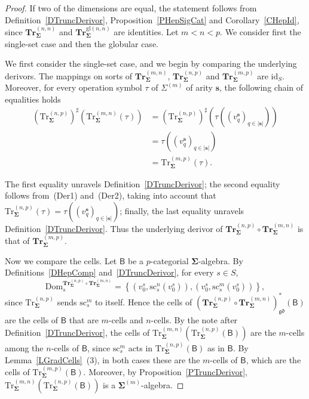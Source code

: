 \documentclass[a4paper, reqno
]{amsart}
\newcommand{\bb}[1]{\ensuremath{\lvert #1 \rvert}}
\newcommand{\sig}[1]{\mathbf{#1}}             %
\newcommand{\calg}[1]{\boldsymbol{\mathsf{#1}}} %
\newcommand{\Dom}{\mathrm{Dom}}
\newcommand{\id}{\mathrm{id}}
\newcommand{\gd}{\mathfrak{gd}}              %
\newcommand{\gl}{\mathrm{gl}}                %
\newcommand{\src}{\mathrm{sc}}
\newcommand{\Tr}{\mathrm{Tr}}
\newcommand{\bTr}{\mathbf{Tr}}
\theoremstyle{plain}
\theoremstyle{definition}
\begin{document}
\begin{proof}
If two of the dimensions are equal, the statement follows from Definition~\ref{DTruncDerivor}, Proposition~\ref{PHepSigCat} and Corollary~\ref{CHepId}, since $\bTr^{(n,n)}_{\sig{\Sigma}}$ and $\bTr^{\gl(n,n)}_{\sig{\Sigma}}$ are identities.
Let $m<n<p$.
We consider first the single-set case and then the globular case.

We first consider the single-set case, and we begin by comparing the underlying derivors.
The mappings on sorts of $\bTr^{(m,n)}_{\sig{\Sigma}}$, $\bTr^{(n,p)}_{\sig{\Sigma}}$ and $\bTr^{(m,p)}_{\sig{\Sigma}}$ are $\id_{S}$.
Moreover, for every operation symbol $\tau$ of $\Sigma^{(m)}$ of arity $\mathbf{s}$, the following chain of equalities holds
\begin{align*}
\left(\Tr^{(n,p)}_{\sig{\Sigma}}\right)^{\sharp}\left(\Tr^{(m,n)}_{\sig{\Sigma}}(\tau)\right)
&=
\left(\Tr^{(n,p)}_{\sig{\Sigma}}\right)^{\sharp}\left(\tau\left((v^{\mathbf{s}}_{q})_{q\in\bb{\mathbf{s}}}\right)\right)
\tag{1}
\\&=
\tau\left((v^{\mathbf{s}}_{q})_{q\in\bb{\mathbf{s}}}\right)
\tag{2}
\\&=
\Tr^{(m,p)}_{\sig{\Sigma}}(\tau).
\tag{3}
\end{align*}

The first equality unravels Definition~\ref{DTruncDerivor}; the second equality follows from~(Der1) and~(Der2), taking into account that $\Tr^{(n,p)}_{\sig{\Sigma}}(\tau)=\tau((v^{\mathbf{s}}_{q})_{q\in\bb{\mathbf{s}}})$; finally, the last equality unravels Definition~\ref{DTruncDerivor}.
Thus the underlying derivor of $\bTr^{(n,p)}_{\sig{\Sigma}}\circ\bTr^{(m,n)}_{\sig{\Sigma}}$ is that of $\bTr^{(m,p)}_{\sig{\Sigma}}$.

Now we compare the cells.
Let $\calg{B}$ be a $p$-categorial $\sig{\Sigma}$-algebra.
By Definitions~\ref{DHepComp} and~\ref{DTruncDerivor}, for every $s\in S$,
$$
\Dom^{\bTr^{(n,p)}_{\sig{\Sigma}}\circ\bTr^{(m,n)}_{\sig{\Sigma}}}_{s}=\left\lbrace\left(v^{s}_{0},\src^{n}_{s}(v^{s}_{0})\right),\left(v^{s}_{0},\src^{m}_{s}(v^{s}_{0})\right)\right\rbrace,
$$
since $\Tr^{(n,p)}_{\sig{\Sigma}}$ sends $\src^{m}_{s}$ to itself.
Hence the cells of $(\bTr^{(n,p)}_{\sig{\Sigma}}\circ\bTr^{(m,n)}_{\sig{\Sigma}})^{\ast}_{\gd}(\calg{B})$ are the cells of $\calg{B}$ that are $m$-cells and $n$-cells.
By the note after Definition~\ref{DTruncDerivor}, the cells of $\Tr^{(m,n)}_{\sig{\Sigma}}(\Tr^{(n,p)}_{\sig{\Sigma}}(\calg{B}))$ are the $m$-cells among the $n$-cells of $\calg{B}$, since $\src^{m}_{s}$ acts in $\Tr^{(n,p)}_{\sig{\Sigma}}(\calg{B})$ as in $\calg{B}$.
By Lemma~\ref{LGradCells}~(3), in both cases these are the $m$-cells of $\calg{B}$, which are the cells of $\Tr^{(m,p)}_{\sig{\Sigma}}(\calg{B})$.
Moreover, by Proposition~\ref{PTruncDerivor}, $\Tr^{(m,n)}_{\sig{\Sigma}}(\Tr^{(n,p)}_{\sig{\Sigma}}(\calg{B}))$ is a $\sig{\Sigma}^{(m)}$-algebra.


\end{proof}
\end{document}
